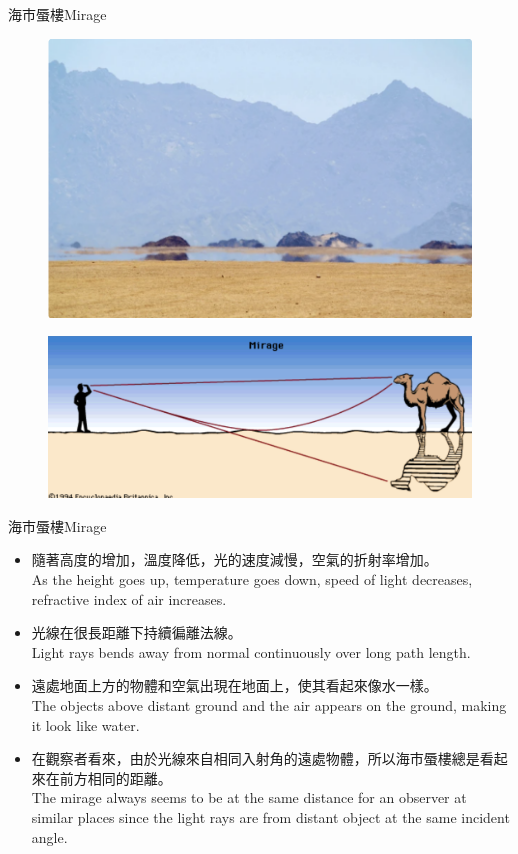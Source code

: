 \documentclass[beamer=true]{standalone}
\begin{document}





\begin{frame}{海市蜃樓Mirage}
\begin{figure}
    \centering
    \includegraphics[width=0.5\linewidth]{assets/xue89nu98u8323.png}
\end{figure}
    \begin{figure}
        \centering
        \includegraphics[width=0.75\linewidth]{assets/dm2u982und0un2389d3n209de.png}
        
        
    \end{figure}
      
\end{frame}

\begin{frame}{海市蜃樓Mirage}
\begin{itemize}
    \item 隨著高度的增加，溫度降低，光的速度減慢，空氣的折射率增加。\\As the height goes up, temperature goes down, speed of light decreases, refractive index of air increases.
    \item 光線在很長距離下持續徧離法線。\\Light rays bends away from normal continuously over long path length.
    \item 遠處地面上方的物體和空氣出現在地面上，使其看起來像水一樣。\\The objects above distant ground and the air appears on the ground, making it look like water.
    \item 在觀察者看來，由於光線來自相同入射角的遠處物體，所以海市蜃樓總是看起來在前方相同的距離。\\The mirage always seems to be at the same distance for an observer at similar places since the light rays are from distant object at the same incident angle.
\end{itemize}
    
\end{frame}
\end{document}
